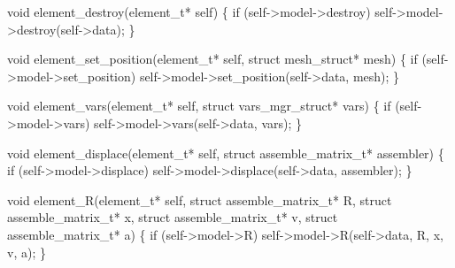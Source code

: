 void element_destroy(element_t* self)
\{
    if (self->model->destroy)
        self->model->destroy(self->data);
\}

\nwendcode{}\nwdocspar

\nwenddocs{}\plusendmoddef
void element_set_position(element_t* self, struct mesh_struct* mesh)
\{
    if (self->model->set_position)
        self->model->set_position(self->data, mesh);
\}

\nwendcode{}\nwdocspar

\nwenddocs{}\plusendmoddef
void element_vars(element_t* self, struct vars_mgr_struct* vars)
\{
    if (self->model->vars)
        self->model->vars(self->data, vars);
\}

\nwendcode{}\nwdocspar

\nwenddocs{}\plusendmoddef
void element_displace(element_t* self, struct assemble_matrix_t* assembler)
\{
    if (self->model->displace)
        self->model->displace(self->data, assembler);
\}

void element_R(element_t* self, struct assemble_matrix_t* R,
               struct assemble_matrix_t* x,
               struct assemble_matrix_t* v,
               struct assemble_matrix_t* a)
\{
    if (self->model->R)
        self->model->R(self->data, R, x, v, a);
\}

